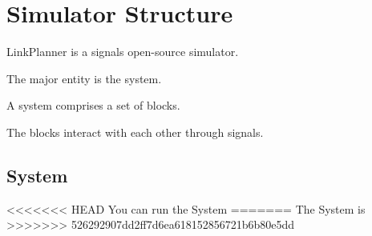 
\chapter{Simulator Structure}

LinkPlanner is a signals open-source simulator.

The major entity is the system.

A system comprises a set of blocks.

The blocks interact with each other through signals.

\section{System}

<<<<<<< HEAD
You can run the System
=======
The System is
>>>>>>> 526292907dd2ff7d6ea618152856721b6b80e5dd





